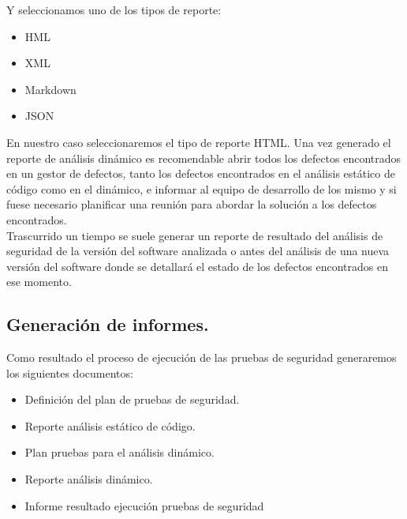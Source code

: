 Y seleccionamos uno de los tipos de reporte:

\begin{itemize}
    \item HML
    \item XML
    \item Markdown
    \item JSON
\end{itemize}

En nuestro caso seleccionaremos el tipo de reporte HTML. Una vez generado el reporte de análisis dinámico es recomendable 
abrir todos los defectos encontrados en un gestor de defectos, tanto los defectos encontrados en el
análisis estático de código como en el  dinámico, e informar al equipo de desarrollo de los mismo y si fuese necesario 
planificar una reunión para abordar la solución a los defectos encontrados.\\

Trascurrido un tiempo se suele generar un reporte de resultado del análisis de seguridad de la versión del software analizada o antes 
del análisis de una nueva versión del software donde se detallará el estado de los defectos encontrados en ese momento. 
\newpage

\subsection{Generación de informes.}
\label{section:GeneracionInformes}

Como resultado el proceso de ejecución de las pruebas de seguridad generaremos los siguientes documentos:

\begin{itemize}
    \item Definición del plan de pruebas de seguridad.
    \item Reporte análisis estático de código.
    \item Plan pruebas para el análisis dinámico.
    \item Reporte análisis dinámico.
    \item Informe resultado ejecución pruebas de seguridad
\end{itemize}

\newpage